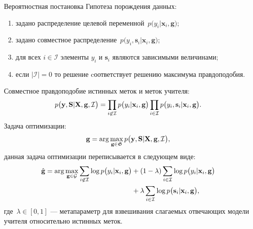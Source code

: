 \documentclass[10pt,pdf,hyperref={unicode}]{beamer}
\begin{document}
\begin{frame}{Вероятностная постановка}
\justifying
Гипотеза порождения данных:
\begin{enumerate}
	\item задано распределение целевой переменной~$p\bigr(y_i|\mathbf{x}_i, \mathbf{g}\bigr)$;
	\item задано совместное распределение~$p\bigr(y_i, \mathbf{s}_i|\mathbf{x}_i, \mathbf{g}\bigr)$;
	\item для всех $i \in \mathcal{I}$ элементы $y_i$ и $\mathbf{s}_i$ являются зависимыми величинами;
	\item если $|\mathcal{I}|=0$ то решение cоответствует решению максимума правдоподобия.
\end{enumerate}
Совместное правдоподобие истинных меток и меток учителя:
\[
\setlength\abovedisplayskip{0pt}
p\bigr(\mathbf{y}, \mathbf{S}|\mathbf{X}, \mathbf{g}, \mathcal{I}\bigr)=\prod_{i\not\in \mathcal{I}}p\bigr(y_i|\mathbf{x}_i, \mathbf{g}\bigr)\prod_{i\in \mathcal{I}}p\bigr(y_i, \mathbf{s}_i|\mathbf{x}_i, \mathbf{g}\bigr).
\setlength\belowdisplayskip{0pt}
\]
Задача оптимизации:
\[
\setlength\abovedisplayskip{0pt}
\mathbf{g} = \arg\max_{\mathbf{g} \in \mathfrak{G}} p\bigr(\mathbf{y}, \mathbf{S}|\mathbf{X}, \mathbf{g}, \mathcal{I}\bigr),
\setlength\belowdisplayskip{0pt}
\]
данная задача оптимизации переписывается в следующем виде:
\[
\setlength\abovedisplayskip{0pt}
\begin{aligned}
\hat{\mathbf{g}} = \arg\max_{\mathbf{g}\in \mathcal{G}} \sum_{i\not\in \mathcal{I}}\log p\bigr(y_i|\mathbf{x}_i, \mathbf{g}\bigr) &+ \left(1-\lambda\right)\sum_{i\in \mathcal{I}}\log p\bigr(y_i|\mathbf{x}_i, \mathbf{g}\bigr) \\
&+ \lambda\sum_{i\in \mathcal{I}}\log p\bigr(\mathbf{s}_i|\mathbf{x}_i, \mathbf{g}\bigr),
\end{aligned}
\setlength\belowdisplayskip{0pt}
\]
где~$\lambda \in [0,1]$ --- метапараметр для взвешивания слагаемых отвечающих модели учителя относительно истинных меток.

\end{frame}
\end{document}
